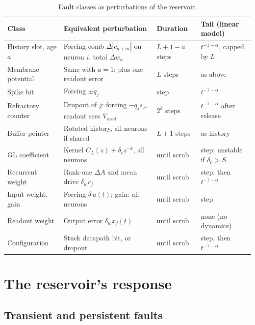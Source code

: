 \documentclass[11pt,a4paper]{article}
\begin{document}
\begin{table}[h]
\centering
\small
\begin{tabularx}{\textwidth}{@{}l>{\raggedright\arraybackslash}X>{\raggedright\arraybackslash}p{3.0cm}>{\raggedright\arraybackslash}p{3.1cm}@{}}
\toprule
Class & Equivalent perturbation & Duration & Tail (linear model) \\
\midrule
History slot, age $a$ & Forcing comb $\Delta|c_{a+m}|$ on neuron $i$, total $\Delta w_a$ & $L+1-a$ steps & $t^{-1-\alpha}$, capped by $L$ \\
Membrane potential & Same with $a = 1$; plus one readout error & $L$ steps & as above \\
Spike bit & Forcing $\pm q_j$ & 1 step & $t^{-1-\alpha}$ \\
Refractory counter & Dropout of $j$: forcing $-q_j s_j$, readout sees $V_{\mathrm{reset}}$ & $2^{k}$ steps & $t^{-1-\alpha}$ after release \\
Buffer pointer & Rotated history, all neurons if shared & $L+1$ steps & as history \\
GL coefficient & Kernel $C_L(z) + \delta_c z^{-k}$, all neurons & until scrub & step; unstable if $\delta_c > S$ \\
Recurrent weight & Rank-one $\Delta A$ and mean drive $\delta_w r_j$ & until scrub & step, then $t^{-1-\alpha}$ \\
Input weight, gain & Forcing $\delta\,u(t)$; gain: all neurons & until scrub & step \\
Readout weight & Output error $\delta_w x_j(t)$ & until scrub & none (no dynamics) \\
Configuration & Stuck datapath bit, or dropout & until scrub & step, then $t^{-1-\alpha}$ \\
\bottomrule
\end{tabularx}
\caption{Fault classes as perturbations of the reservoir.}
\label{tab:forcing}
\end{table}

\section{The reservoir's response}
\label{sec:response}

\subsection{Transient and persistent faults}
\end{document}
